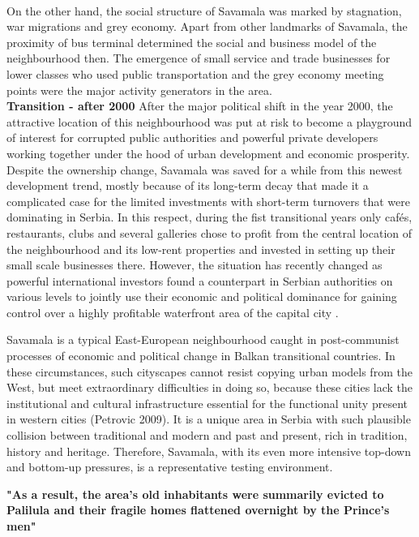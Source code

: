 \documentclass[11pt]{report}
\begin{document}
\\
On the other hand, the social structure of Savamala was marked by stagnation, war migrations and grey economy. Apart from other landmarks of Savamala, the proximity of bus terminal determined the social and business model of the neighbourhood then. The emergence of small service and trade businesses for lower classes who used public transportation and the grey economy meeting points were the major activity generators in the area.
\\
\textbf{Transition - after 2000}
After the major political shift in the year 2000, the attractive location of this neighbourhood was put at risk to become a playground of interest for corrupted public authorities and powerful private developers working together under the hood of urban development and economic prosperity.
Despite the ownership change, Savamala was saved for a while from this newest development trend, mostly because of its long-term decay that made it a complicated case for the limited investments with short-term turnovers that were dominating in Serbia.
In this respect, during the fist transitional years only cafés, restaurants, clubs and several galleries chose to profit from the central location of the neighbourhood and its low-rent properties and invested in setting up their small scale businesses there.
However, the situation has recently changed as powerful international investors found a counterpart in Serbian authorities on various levels to jointly use their economic and political dominance for gaining control over a highly profitable waterfront area of the capital city \cite{Zeković et al., 2016; Cvetinovic et al., 2016b)}.

Savamala is a typical East-European neighbourhood caught in post-communist processes of economic and political change in Balkan transitional countries. In these circumstances, such cityscapes cannot resist copying urban models from the West, but meet extraordinary difficulties in doing so, because these cities lack the institutional and cultural infrastructure essential for the functional unity present in western cities (Petrovic 2009). It is a unique area in Serbia with such plausible collision between traditional and modern and past and present, rich in tradition, history and heritage.
Therefore, Savamala, with its even more intensive top-down and bottom-up pressures, is a representative testing environment.

\textbf{"As a result, the area's old inhabitants were summarily evicted to Palilula  and their fragile homes flattened overnight by the Prince's men" \cite{bureau savamala}}
\end{document}
